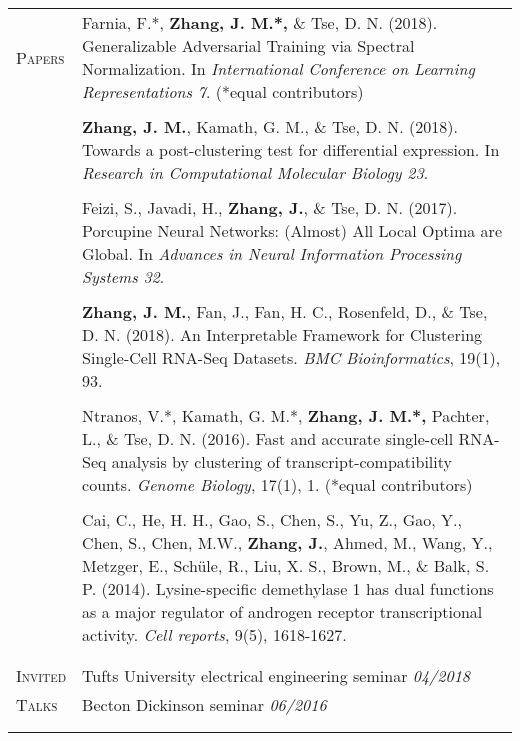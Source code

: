 \documentclass[letterpaper,11pt,oneside]{article}
\begin{document}
\begin{longtable}{@{} p{2.5cm} p{14.8cm}}
 \large{\textsc{Papers}}  & Farnia, F.*, \textbf{Zhang, J. M.*,} \& Tse, D. N. (2018). Generalizable Adversarial Training via Spectral Normalization. In \textit{International Conference on Learning Representations 7}. (*equal contributors) \\
 	& \\
 
 & \textbf{Zhang, J. M.}, Kamath, G. M., \& Tse, D. N. (2018). Towards a post-clustering test for differential expression. In \textit{Research in Computational Molecular Biology 23}. \\
 	& \\
 
 & Feizi, S., Javadi, H., \textbf{Zhang, J.}, \& Tse, D. N. (2017). Porcupine Neural Networks: (Almost) All Local Optima are Global. In \textit{Advances in Neural Information Processing Systems 32}. \\
 	& \\
 
     & \textbf{Zhang, J. M.}, Fan, J., Fan, H. C., Rosenfeld, D., \&  Tse, D. N. (2018). An Interpretable Framework for Clustering Single-Cell RNA-Seq Datasets. \textit{BMC Bioinformatics}, 19(1), 93. \\
     & \\
     
     & Ntranos, V.*, Kamath, G. M.*, \textbf{Zhang, J. M.*,} Pachter, L., \& Tse, D. N. (2016). Fast and accurate single-cell RNA-Seq analysis by clustering of transcript-compatibility counts. \textit{Genome Biology}, 17(1), 1. (*equal contributors) \\
     & \\
     
     & Cai, C., He, H. H., Gao, S., Chen, S., Yu, Z., Gao, Y., Chen, S., Chen, M.W., \textbf{Zhang, J.}, Ahmed, M., Wang, Y., Metzger, E., Sch\"{u}le, R., Liu, X. S., Brown, M., \& Balk, S. P. (2014). Lysine-specific demethylase 1 has dual functions as a major regulator of androgen receptor transcriptional activity. \textit{Cell reports}, 9(5), 1618-1627. \\
     & \\ 
     & \\
     

 \large{\textsc{Invited}}  & Tufts University electrical engineering seminar  \hfill \textit{04/2018}\\*
 \large{\textsc{Talks}} & Becton Dickinson seminar  \hfill \textit{06/2016} \\
 & \\
 & \\
    

\end{longtable}
\end{document}
